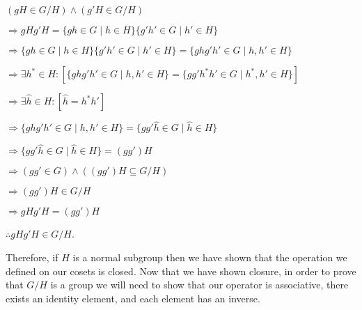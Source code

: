 \documentclass[12pt, a4paper]{article}
\begin{document}
\hspace{2mm} $(gH\in G/H)\wedge(g'H\in G/H)$\par
\vspace{2mm}
\hspace{10mm} $\Rightarrow gHg'H=\{gh\in G\mid h\in H\}\{g'h'\in G\mid h'\in H\}$\par
\vspace{2mm}
\hspace{10mm} $\Rightarrow\{gh\in G\mid h\in H\}\{g'h'\in G\mid h'\in H\}=\{ghg'h'\in G\mid h,h'\in H\}$\par
\vspace{2mm}
\hspace{10mm} $\Rightarrow\exists h^{\ast}\in H\colon[\{ghg'h'\in G\mid h,h'\in H\}=\{gg'h^{\ast}h'\in G\mid h^{\ast},h'\in H\}]$\par
\vspace{2mm}
\hspace{10mm} $\Rightarrow\exists\hat{h}\in H\colon[\hat{h}=h^{\ast}h']$\par
\vspace{2mm}
\hspace{10mm} $\Rightarrow\{ghg'h'\in G\mid h,h'\in H\}=\{gg'\hat{h}\in G\mid \hat{h}\in H\}$\par
\vspace{2mm}
\hspace{10mm} $\Rightarrow\{gg'\hat{h}\in G\mid\hat{h}\in H\}=(gg')H$\par
\vspace{2mm}
\hspace{10mm} $\Rightarrow (gg'\in G)\wedge((gg')H\subseteq G/H)$\par
\vspace{2mm}
\hspace{10mm} $\Rightarrow (gg')H\in G/H$\par
\vspace{2mm}
\hspace{10mm} $\Rightarrow gHg'H=(gg')H$\par
\vspace{2mm}
\hspace{2mm} $\therefore gHg'H\in G/H$.\par

\vspace{4mm}

    Therefore, if $H$ is a normal subgroup then we have shown that the operation we defined on our cosets is closed. Now that we have shown closure, in order to prove that $G/H$ is a group we will need to show that our operator is associative, there exists an identity element, and each element has an inverse.
    
\end{document}
